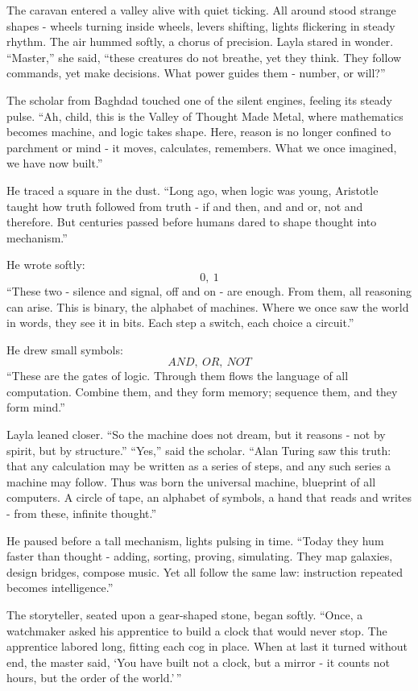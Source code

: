 \documentclass[
  letterpaper,
  DIV=11,
  numbers=noendperiod]{scrreprt}
\begin{document}
The caravan entered a valley alive with quiet ticking. All around stood
strange shapes - wheels turning inside wheels, levers shifting, lights
flickering in steady rhythm. The air hummed softly, a chorus of
precision. Layla stared in wonder. ``Master,'' she said, ``these
creatures do not breathe, yet they think. They follow commands, yet make
decisions. What power guides them - number, or will?''

The scholar from Baghdad touched one of the silent engines, feeling its
steady pulse. ``Ah, child, this is the Valley of Thought Made Metal,
where mathematics becomes machine, and logic takes shape. Here, reason
is no longer confined to parchment or mind - it moves, calculates,
remembers. What we once imagined, we have now built.''

He traced a square in the dust. ``Long ago, when logic was young,
Aristotle taught how truth followed from truth - if and then, and and
or, not and therefore. But centuries passed before humans dared to shape
thought into mechanism.''

He wrote softly: \[
0,\ 1
\] ``These two - silence and signal, off and on - are enough. From them,
all reasoning can arise. This is binary, the alphabet of machines. Where
we once saw the world in words, they see it in bits. Each step a switch,
each choice a circuit.''

He drew small symbols: \[
AND,\ OR,\ NOT
\] ``These are the gates of logic. Through them flows the language of
all computation. Combine them, and they form memory; sequence them, and
they form mind.''

Layla leaned closer. ``So the machine does not dream, but it reasons -
not by spirit, but by structure.'' ``Yes,'' said the scholar. ``Alan
Turing saw this truth: that any calculation may be written as a series
of steps, and any such series a machine may follow. Thus was born the
universal machine, blueprint of all computers. A circle of tape, an
alphabet of symbols, a hand that reads and writes - from these, infinite
thought.''

He paused before a tall mechanism, lights pulsing in time. ``Today they
hum faster than thought - adding, sorting, proving, simulating. They map
galaxies, design bridges, compose music. Yet all follow the same law:
instruction repeated becomes intelligence.''

The storyteller, seated upon a gear-shaped stone, began softly. ``Once,
a watchmaker asked his apprentice to build a clock that would never
stop. The apprentice labored long, fitting each cog in place. When at
last it turned without end, the master said, `You have built not a
clock, but a mirror - it counts not hours, but the order of the
world.'\,''
\end{document}
